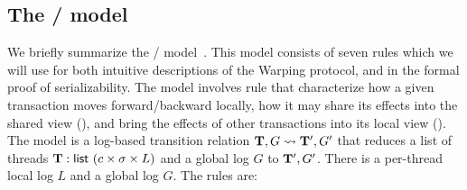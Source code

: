 \newcommand\STEP{{\sc step}}
\newcommand\BEGIN{{\sc begin}}
\newcommand\LOCAL{{\sc local}}
\newcommand\FIN{{\sc fin}}
\newcommand\FORK{{\sc fork}}

\subsection{The \PUSH{}/\PULL{} model}

We briefly summarize the \PUSH{}/\PULL{} model~\cite{KP:PLDI15}. This model consists of
seven rules which we will use for both intuitive descriptions of the
Warping protocol, and in the formal proof of serializability.
The \PMPY{} model involves rule that characterize how a given transaction moves forward/backward
locally, how it may share its effects into the shared view (\PUSH),
and bring the effects of other transactions into its local view
(\PULL). 
The  model is a log-based transition relation
$\mathbf{T},G \rightsquigarrow \mathbf{T}', G'$ that reduces
a list of threads $\mathbf{T} : \textsf{list } (c\times \sigma
\times L)$ and a global log $G$ to $\mathbf{T}',G'$.
%
There is a per-thread local log $L$ and a global log $G$.
The rules are:
